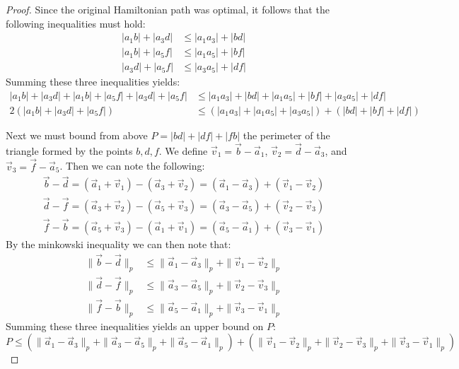 \documentclass{article}
\theoremstyle{definition}
\begin{document}
\begin{proof}
    Since the original Hamiltonian path was optimal, it follows that the following inequalities must hold:
    \begin{align*}
        |a_1 b| + |a_3 d| &\leq |a_1 a_3| + |b d| \\
        |a_1 b| + |a_5 f| &\leq |a_1 a_5| + |b f| \\
        |a_3 d| + |a_5 f| &\leq |a_3 a_5| + |d f|
    \end{align*}
    Summing these three inequalities yields:
    \begin{align*}
        |a_1 b| + |a_3 d| + |a_1 b| + |a_5 f| + |a_3 d| + |a_5 f| &\leq |a_1 a_3| + |b d| + |a_1 a_5| + |b f| + |a_3 a_5| + |d f| \\
        2(|a_1 b| + |a_3 d| + |a_5 f|) &\leq (|a_1 a_3| + |a_1 a_5| + |a_3 a_5|) + (|b d| + |b f| + |d f|)
    \end{align*}

    Next we must bound from above $P = |b d| + |d f| + |f b|$ the perimeter of the triangle formed by the points $b, d, f$.
    We define $\vec v_1 = \vec b - \vec a_1$, $\vec v_2 = \vec d - \vec a_3$, and $\vec v_3 = \vec f - \vec a_5$.
    Then we can note the following:
    \begin{eqnarray}
        \vec b - \vec d = (\vec a_1 + \vec v_1) - (\vec a_3 + \vec v_2) = (\vec a_1 - \vec a_3) + (\vec v_1 - \vec v_2) \\
        \vec d - \vec f = (\vec a_3 + \vec v_2) - (\vec a_5 + \vec v_3) = (\vec a_3 - \vec a_5) + (\vec v_2 - \vec v_3) \\
        \vec f - \vec b = (\vec a_5 + \vec v_3) - (\vec a_1 + \vec v_1) = (\vec a_5 - \vec a_1) + (\vec v_3 - \vec v_1)
    \end{eqnarray}
    By the minkowski inequality we can then note that:
    \begin{align}
        \|\vec b - \vec d\|_p &\leq \|\vec a_1 - \vec a_3\|_p + \|\vec v_1 - \vec v_2\|_p \\
        \|\vec d - \vec f\|_p &\leq \|\vec a_3 - \vec a_5\|_p + \|\vec v_2 - \vec v_3\|_p \\
        \|\vec f - \vec b\|_p &\leq \|\vec a_5 - \vec a_1\|_p + \|\vec v_3 - \vec v_1\|_p
    \end{align}
    Summing these three inequalities yields an upper bound on $P$:
    \[
        P \leq (\|\vec a_1 - \vec a_3\|_p + \|\vec a_3 - \vec a_5\|_p + \|\vec a_5 - \vec a_1\|_p) + (\|\vec v_1 - \vec v_2\|_p + \|\vec v_2 - \vec v_3\|_p + \|\vec v_3 - \vec v_1\|_p)
    \]


\end{proof}
\end{document}
